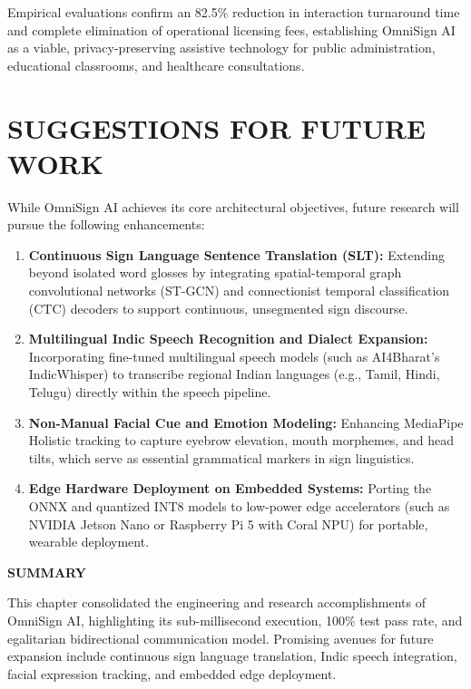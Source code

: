 \documentclass[12pt,a4paper]{report}
\begin{document}
Empirical evaluations confirm an 82.5\% reduction in interaction turnaround time and complete elimination of operational licensing fees, establishing OmniSign AI as a viable, privacy-preserving assistive technology for public administration, educational classrooms, and healthcare consultations.

\section{SUGGESTIONS FOR FUTURE WORK} \label{sec:concl-future}
While OmniSign AI achieves its core architectural objectives, future research will pursue the following enhancements:
\begin{enumerate}[noitemsep, topsep=2pt]
\item \textbf{Continuous Sign Language Sentence Translation (SLT):} Extending beyond isolated word glosses by integrating spatial-temporal graph convolutional networks (ST-GCN) and connectionist temporal classification (CTC) decoders to support continuous, unsegmented sign discourse.
\item \textbf{Multilingual Indic Speech Recognition and Dialect Expansion:} Incorporating fine-tuned multilingual speech models (such as AI4Bharat's IndicWhisper) to transcribe regional Indian languages (e.g., Tamil, Hindi, Telugu) directly within the speech pipeline.
\item \textbf{Non-Manual Facial Cue and Emotion Modeling:} Enhancing MediaPipe Holistic tracking to capture eyebrow elevation, mouth morphemes, and head tilts, which serve as essential grammatical markers in sign linguistics.
\item \textbf{Edge Hardware Deployment on Embedded Systems:} Porting the ONNX and quantized INT8 models to low-power edge accelerators (such as NVIDIA Jetson Nano or Raspberry Pi 5 with Coral NPU) for portable, wearable deployment.
\end{enumerate}
\vspace{0.2cm}
\noindent\textbf{SUMMARY}\nopagebreak\par\vspace{0.1cm}
This chapter consolidated the engineering and research accomplishments of OmniSign AI, highlighting its sub-millisecond execution, 100\% test pass rate, and egalitarian bidirectional communication model. Promising avenues for future expansion include continuous sign language translation, Indic speech integration, facial expression tracking, and embedded edge deployment.
\clearpage
\end{document}
